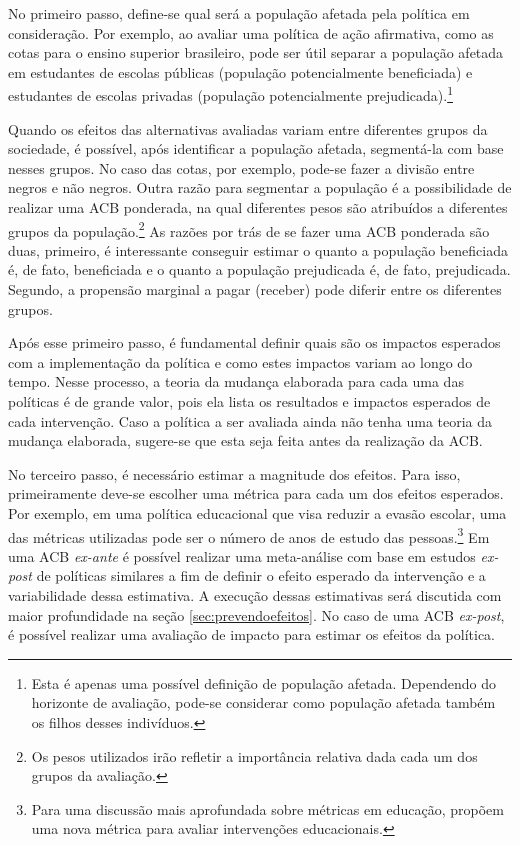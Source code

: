 \documentclass[12pt,letterpaper]{article}
\newcommand{\1}{\mathbbm{1}}
\numberwithin{equation}{section}
\begin{document}
No primeiro passo, define-se qual será a população afetada pela política em consideração. Por exemplo, ao avaliar uma política de ação afirmativa, como as cotas para o ensino superior brasileiro, pode ser útil separar a população afetada em estudantes de escolas públicas (população potencialmente beneficiada) e estudantes de escolas privadas (população potencialmente prejudicada).\footnote{Esta é apenas uma possível definição de população afetada. Dependendo do horizonte de avaliação, pode-se considerar como população afetada também os filhos desses indivíduos.}

Quando os efeitos das alternativas avaliadas variam entre diferentes grupos da sociedade, é possível, após identificar a população afetada, segmentá-la com base nesses grupos. No caso das cotas, por exemplo, pode-se fazer a divisão entre negros e não negros. Outra razão para segmentar a população é a possibilidade de realizar uma ACB ponderada, na qual diferentes pesos são atribuídos a diferentes grupos da população.\footnote{Os pesos utilizados irão refletir a importância relativa dada cada um dos grupos da avaliação.} As razões por trás de se fazer uma ACB ponderada são duas, primeiro, é interessante conseguir estimar o quanto a população beneficiada é, de fato, beneficiada e o quanto a população prejudicada é, de fato, prejudicada. Segundo, a propensão marginal a pagar (receber) pode diferir entre os diferentes grupos.

Após esse primeiro passo, é fundamental definir quais são os impactos esperados com a implementação da política e como estes impactos variam ao longo do tempo. Nesse processo, a teoria da mudança elaborada para cada uma das políticas é de grande valor, pois ela lista os resultados e impactos esperados de cada intervenção. Caso a política a ser avaliada ainda não tenha uma teoria da mudança elaborada, sugere-se que esta seja feita antes da realização da ACB.

No terceiro passo, é necessário estimar a magnitude dos efeitos. Para isso, primeiramente deve-se escolher uma métrica para cada um dos efeitos esperados. Por exemplo, em uma política educacional que visa reduzir a evasão escolar, uma das métricas utilizadas pode ser o número de anos de estudo das pessoas.\footnote{Para uma discussão mais aprofundada sobre métricas em educação, \cite{angrist_how_2020} propõem uma nova métrica para avaliar intervenções educacionais.} Em uma ACB \textit{ex-ante} é possível realizar uma meta-análise com base em estudos \textit{ex-post} de políticas similares a fim de definir o efeito esperado da intervenção e a variabilidade dessa estimativa. A execução dessas estimativas será discutida com maior profundidade na seção \ref{sec:prevendoefeitos}. No caso de uma ACB \textit{ex-post}, é possível realizar uma avaliação de impacto para estimar os efeitos da política.
\end{document}

